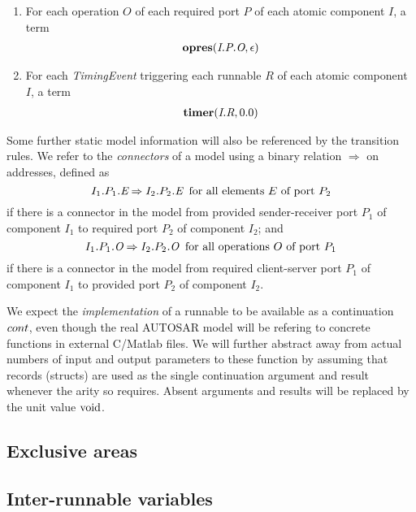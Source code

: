 \documentclass[twocolumn]{article}
\begin{document}
\begin{enumerate}
\item For each operation $O$ of each required port $P$ of each atomic component $I$, a term
\[
\begin{array}{c}
	\opres{\Tep{O}{P}{I}}{\epsilon}
\end{array}
\]

\item For each \emph{TimingEvent} triggering each runnable $R$ of each atomic component $I$, a term
\[
\begin{array}{c}
	\timer{\Tr{R}{I}}{0.0}
\end{array}
\]

\end{enumerate}

Some further static model information will also be referenced by the transition rules. We refer to the \emph{connectors} of a model using a binary relation $\Rightarrow$ on addresses, defined as
\[
	\Tconnect{\Tep{E}{$P_1$}{$I_1$}}{\Tep{E}{$P_2$}{$I_2$}} \;\;\text{for all elements $E$ of port $P_2$}
\]
if there is a connector in the model from provided sender-receiver port $P_1$ of component $I_1$ to required port $P_2$ of component $I_2$; and
\[
	\Tconnect{\Top{O}{$P_1$}{$I_1$}}{\Top{O}{$P_2$}{$I_2$}} \;\;\text{for all operations $O$ of port $P_1$}
\]
if there is a connector in the model from required client-server port $P_1$ of component $I_1$ to provided port $P_2$ of component $I_2$.

We expect the \emph{implementation} of a runnable to be available as a continuation $\Cont$, even though the real AUTOSAR model will be refering to concrete functions in external C/Matlab files. We will further abstract away from actual numbers of input and output parameters to these function by assuming that records (structs) are used as the single continuation argument and result whenever the arity so requires. Absent arguments and results will be replaced by the unit value $\Tvoid$.

\subsection{Exclusive areas}


\subsection{Inter-runnable variables}
\end{document}
